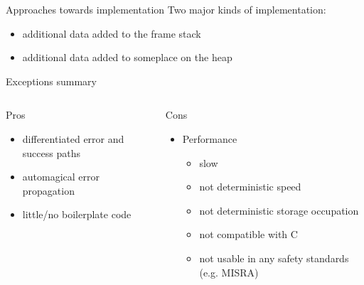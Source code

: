 \documentclass[10pt]{beamer}
\begin{document}
\begin{frame}{Approaches towards implementation}
	Two major kinds of implementation:
	\begin{itemize}[<+- | alert@+>]
		\item additional data added to the frame stack
		\item additional data added to someplace on the heap
	\end{itemize}
\end{frame}
	


\begin{frame}{Exceptions summary}
	\begin{columns}[T]
		\begin{column}{0.48\linewidth}
			Pros
			\begin{itemize}[<+- | alert@+>]
				\item differentiated error and success paths
				\item automagical error propagation
				\item little/no boilerplate code
			\end{itemize} \pause
		\end{column}
	\begin{column}{0.48\linewidth}
			Cons
			\begin{itemize}
				\item Performance
				\begin{itemize}[<+- | alert@+>]
					\item slow
					\item not deterministic speed
					\item not deterministic storage occupation
					\item not compatible with C
					\item not usable in any safety standards (e.g. MISRA)
				\end{itemize}
			\end{itemize}
	\end{column}
	\end{columns}
\end{frame}
\end{document}
